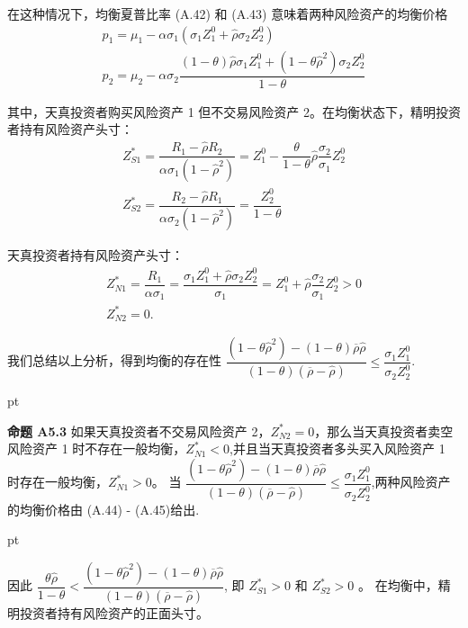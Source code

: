 \documentclass[10.0pt]{article}
\begin{document}
在这种情况下，均衡夏普比率 (A.42) 和 (A.43) 意味着两种风险资产的均衡价格
\begin{eqnarray}
& p_1 = \mu_1 - \alpha \sigma_1 (\sigma_1 Z_1^0 + {\hat \rho} \sigma_2 Z_2^0) & \\
& p_2 = \mu_2 - \alpha \sigma_2 \dfrac{(1 - \theta) {\hat \rho} \sigma_1 Z_1^0 + (1 - \theta {\hat \rho}^2) \sigma_2 Z_2^0}{1 - \theta} &
\end{eqnarray}


其中，天真投资者购买风险资产 1 但不交易风险资产 2。在均衡状态下，精明投资者持有风险资产头寸：
\begin{eqnarray}
& Z_{S 1}^* = \dfrac{R_1 - \hat \rho R_2}{\alpha \sigma_1 (1 - \hat \rho^2)} = Z_1^0 - \dfrac{\theta}{1 - \theta} {\hat \rho} \dfrac{\sigma_2}{\sigma_1} Z_2^0 & \\
& Z_{S 2}^* = \dfrac{R_2 - \hat \rho R_1}{\alpha \sigma_2 (1 - \hat \rho^2)} = \dfrac{Z_2^0}{1 - \theta} &
\end{eqnarray}

天真投资者持有风险资产头寸：
\begin{eqnarray}
& Z_{N 1}^* = \dfrac{R_1}{\alpha \sigma_1} = \dfrac{\sigma_1 Z_1^0 + {\hat \rho} \sigma_2 Z_2^0}{\sigma_1} = Z_1^0 + {\hat \rho} \dfrac{\sigma_2}{\sigma_1} Z_2^0 > 0 & \\
& Z_{N 2}^* = 0. &
\end{eqnarray}

我们总结以上分析，得到均衡的存在性 $ \dfrac{(1 - \theta {\hat \rho}^2) - (1 - \theta) \overline{\rho} {\hat \rho}}{(1 - \theta) (\overline{\rho} - {\hat \rho})} \leqslant \dfrac{\sigma_1 Z_1^0}{\sigma_2 Z_2^0} $.

 pt



{\bf 命题 A5.3} 如果天真投资者不交易风险资产 2，$ Z_{N 2}^* = 0 $，那么当天真投资者卖空风险资产 1 时不存在一般均衡，$ Z_{N 1}^* < 0 $,并且当天真投资者多头买入风险资产 1 时存在一般均衡，$ Z_{N 1}^* > 0 $。 当 $ \dfrac{(1 - \theta {\hat \rho}^2) - (1 - \theta) \overline{\rho} {\hat \rho}}{(1 - \theta) (\overline {\rho} - {\hat \rho})} \leqslant \dfrac{\sigma_1 Z_1^0}{\sigma_2 Z_2^0} $,两种风险资产的均衡价格由 (A.44) - (A.45)给出.

 pt

因此 $ \dfrac{\theta {\hat \rho}}{1 - \theta} < \dfrac{(1 - \theta {\hat \rho}^2) - (1 - \theta) \overline{\rho} {\hat \rho}}{(1 - \theta) (\overline{\rho} - {\hat \rho})} $, 即 $ Z_{S 1}^* > 0 $ 和 $ Z_{S 2}^* > 0 $ 。 在均衡中，精明投资者持有风险资产的正面头寸。
\end{document}
